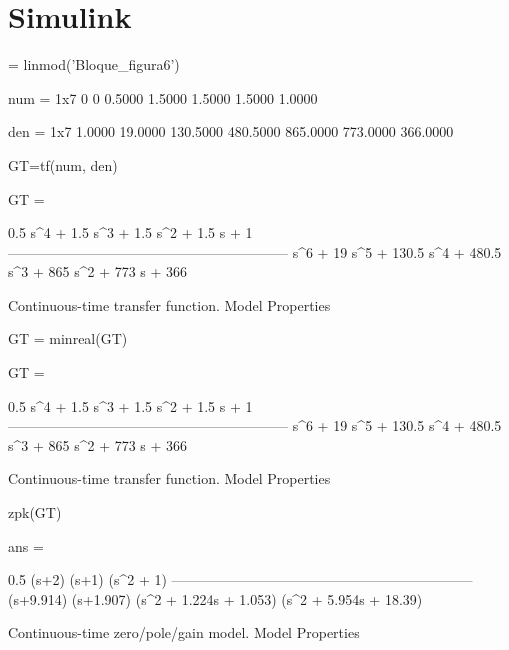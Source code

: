 \documentclass[journal, onecolumn]{IEEEtran}
\begin{document}
\section{Simulink}
\begin{matlabcode}
 = linmod('Bloque_figura6')
\end{matlabcode}
\begin{matlaboutput}
num = 1x7
         0         0    0.5000    1.5000    1.5000    1.5000    1.0000

den = 1x7
    1.0000   19.0000  130.5000  480.5000  865.0000  773.0000  366.0000

\end{matlaboutput}
\begin{matlabcode}
GT=tf(num, den)
\end{matlabcode}
\begin{matlaboutput}
GT =

            0.5 s^4 + 1.5 s^3 + 1.5 s^2 + 1.5 s + 1
  ------------------------------------------------------------
  s^6 + 19 s^5 + 130.5 s^4 + 480.5 s^3 + 865 s^2 + 773 s + 366

Continuous-time transfer function.
Model Properties
\end{matlaboutput}
\begin{matlabcode}

GT = minreal(GT)
\end{matlabcode}
\begin{matlaboutput}
GT =

            0.5 s^4 + 1.5 s^3 + 1.5 s^2 + 1.5 s + 1
  ------------------------------------------------------------
  s^6 + 19 s^5 + 130.5 s^4 + 480.5 s^3 + 865 s^2 + 773 s + 366

Continuous-time transfer function.
Model Properties
\end{matlaboutput}
\begin{matlabcode}
zpk(GT)
\end{matlabcode}
\begin{matlaboutput}
ans =

                      0.5 (s+2) (s+1) (s^2 + 1)
  -----------------------------------------------------------------
  (s+9.914) (s+1.907) (s^2 + 1.224s + 1.053) (s^2 + 5.954s + 18.39)

Continuous-time zero/pole/gain model.
Model Properties
\end{matlaboutput}
\end{document}
